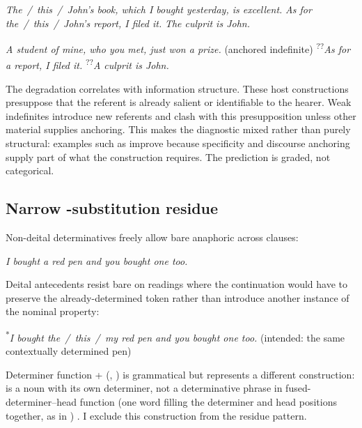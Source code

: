 \documentclass[12pt,letterpaper]{article}
\DeclareRobustCommand{\upslash}{\/\textup{~\slash~}}
\begin{document}
\ea 
\label{ex:host-good}
    \ea \textit{The\upslash this\upslash John's book, which I bought yesterday, is excellent.}
    \ex \textit{As for the\upslash this\upslash John's report, I filed it.}
    \ex \textit{The culprit is John.}
    \z
\z

\ea 
\label{ex:host-mixed}
    \ea \textit{A student of mine, who you met, just won a prize.} (anchored indefinite)
    \ex \textsuperscript{??}\textit{As for a report, I filed it.}
    \ex \textsuperscript{??}\textit{A culprit is John.}
    \z
\z

\noindent The degradation correlates with information structure. These host constructions presuppose that the referent is already salient or identifiable to the hearer. Weak indefinites introduce new referents and clash with this presupposition unless other material supplies anchoring. This makes the diagnostic mixed rather than purely structural: examples such as  improve because specificity and discourse anchoring supply part of what the construction requires. The prediction is graded, not categorical.

\subsection{Narrow -substitution residue}

Non-deital determinatives freely allow bare anaphoric  across clauses:

\ea 
\label{ex:one-weak}
\textit{I bought a red pen and you bought one too.}
\z

\noindent Deital antecedents resist bare  on readings where the continuation would have to preserve the already-determined token rather than introduce another instance of the nominal property:

\ea 
\label{ex:one-strong}
\textsuperscript{*}\textit{I bought the\upslash this\upslash my red pen and you bought one too.} (intended: the same contextually determined pen)
\z

\noindent Determiner function +  (, ) is grammatical but represents a different construction:  is a noun with its own determiner, not a determinative phrase in fused-determiner--head function (one word filling the determiner and head positions together, as in ) \parencite[332--333]{HuddlestonPullum2002}. I exclude this construction from the residue pattern.
\end{document}
